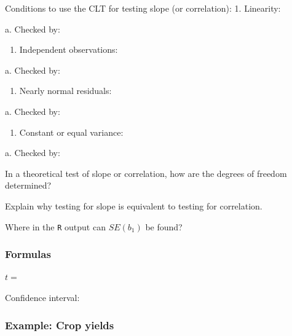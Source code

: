 \documentclass[
]{report}
\providecommand{\tightlist}{%
  \setlength{\itemsep}{0pt}\setlength{\parskip}{0pt}}
\newcommand{\rgs}{\vspace{12pt}} %
\newcommand{\rgi}{\hspace{24pt}}  %
\begin{document}
Conditions to use the CLT for testing slope (or correlation):
1. Linearity:
\rgs

\rgi a. Checked by:
\rgs

\begin{enumerate}
\def\labelenumi{\arabic{enumi}.}
\setcounter{enumi}{1}
\tightlist
\item
  Independent observations:
  \rgs
\end{enumerate}

\rgi a. Checked by:
\rgs

\begin{enumerate}
\def\labelenumi{\arabic{enumi}.}
\setcounter{enumi}{2}
\tightlist
\item
  Nearly normal residuals:
  \rgs
\end{enumerate}

\rgi a. Checked by:
\rgs

\begin{enumerate}
\def\labelenumi{\arabic{enumi}.}
\setcounter{enumi}{3}
\tightlist
\item
  Constant or equal variance:
  \rgs
\end{enumerate}

\rgi a. Checked by:
\rgs

In a theoretical test of slope or correlation, how are the degrees of freedom determined?
\rgs    

Explain why testing for slope is equivalent to testing for correlation.
\rgs

Where in the \texttt{R} output can \(SE(b_1)\) be found?
\rgs

\hypertarget{formulas-11}{%
\subsubsection*{Formulas}\label{formulas-11}}

\(t=\)
\rgs

Confidence interval:
\rgs

\hypertarget{example-crop-yields}{%
\subsubsection*{Example: Crop yields}\label{example-crop-yields}}
\end{document}
